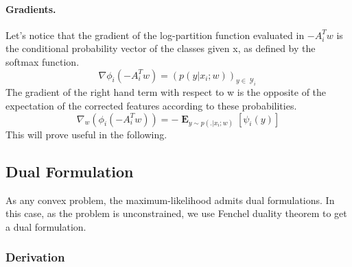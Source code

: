 \documentclass{article}
\DeclareMathOperator{\1}{\mathbb{1}}
\DeclareMathOperator{\E}{\mathbf{E}}
\DeclareMathOperator{\Y}{\mathcal{Y}}
\begin{document}
\paragraph{Gradients.}
Let's notice that the gradient of the log-partition function evaluated in $-A_i^Tw$ is the conditional probability vector of the classes given x, as defined by the softmax function.
\begin{equation}
	\nabla \phi_i(-A_i^Tw) = (p(y | x_i ; w))_{y \in \Y_i}
\end{equation}
The gradient of the right hand term with respect to w is the opposite of the expectation of the corrected features according to these probabilities.
\begin{equation}
	\label{primal gradient}
	\nabla_w (\phi_i(-A_i^Tw)) = - \E_{y \sim p(. | x_i ; w)} [\psi_i(y)]
\end{equation}
This will prove useful in the following.

\subsection{Dual Formulation}

As any convex problem, the maximum-likelihood admits dual formulations.
In this case, as the problem is unconstrained, we use Fenchel duality theorem to get a dual formulation.

\subsubsection*{Derivation}
\end{document}
